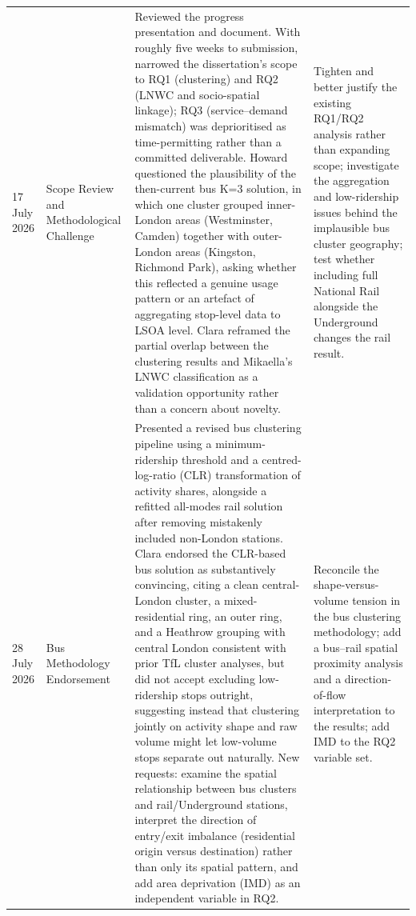 \begin{landscape}
\begin{longtable}{@{}p{2.4cm} p{4.0cm} p{8.0cm} p{6.6cm}@{}}
17 July 2026 & Scope Review and Methodological Challenge & Reviewed the progress presentation and document. With roughly five weeks to submission, narrowed the dissertation's scope to RQ1 (clustering) and RQ2 (LNWC and socio-spatial linkage); RQ3 (service--demand mismatch) was deprioritised as time-permitting rather than a committed deliverable. Howard questioned the plausibility of the then-current bus K=3 solution, in which one cluster grouped inner-London areas (Westminster, Camden) together with outer-London areas (Kingston, Richmond Park), asking whether this reflected a genuine usage pattern or an artefact of aggregating stop-level data to LSOA level. Clara reframed the partial overlap between the clustering results and Mikaella's LNWC classification as a validation opportunity rather than a concern about novelty. & Tighten and better justify the existing RQ1/RQ2 analysis rather than expanding scope; investigate the aggregation and low-ridership issues behind the implausible bus cluster geography; test whether including full National Rail alongside the Underground changes the rail result. \\
28 July 2026 & Bus Methodology Endorsement & Presented a revised bus clustering pipeline using a minimum-ridership threshold and a centred-log-ratio (CLR) transformation of activity shares, alongside a refitted all-modes rail solution after removing mistakenly included non-London stations. Clara endorsed the CLR-based bus solution as substantively convincing, citing a clean central-London cluster, a mixed-residential ring, an outer ring, and a Heathrow grouping with central London consistent with prior TfL cluster analyses, but did not accept excluding low-ridership stops outright, suggesting instead that clustering jointly on activity shape and raw volume might let low-volume stops separate out naturally. New requests: examine the spatial relationship between bus clusters and rail/Underground stations, interpret the direction of entry/exit imbalance (residential origin versus destination) rather than only its spatial pattern, and add area deprivation (IMD) as an independent variable in RQ2. & Reconcile the shape-versus-volume tension in the bus clustering methodology; add a bus--rail spatial proximity analysis and a direction-of-flow interpretation to the results; add IMD to the RQ2 variable set. \\

\end{longtable}
\end{landscape}
